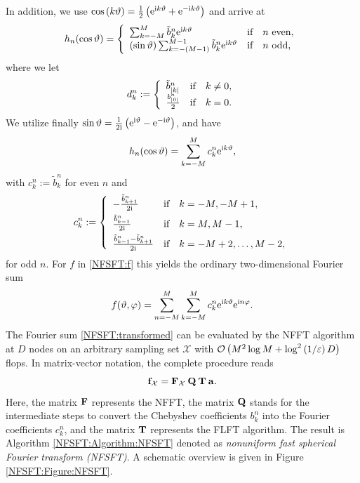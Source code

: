 In addition, we use $\cos{\hspace{-0.4ex}}\left(k \vartheta\right) = \frac{1}{2} \left(\mbox{\rm{e}}^{\mbox{\scriptsize\rm{i}} k \vartheta} + \mbox{\rm{e}}^{-\mbox{\scriptsize\rm{i}} k \vartheta}\right)$ 
and arrive at
\[
  \fun{h_{n}}{\cos\vtheta} = 
    \left\{\begin{array}{l@{\quad \text{if} \quad}l}
      \sum_{k=-M}^{M} \tilde{b}_{k}^n \e^{\im k \vtheta} & n \text{ even},\\
      \paren{\sin \vtheta} \sum_{k=-(M-1)}^{M-1} \tilde{b}_{k}^n \e^{\im k \vtheta} & n \text{ odd},
    \end{array}\right. 
\]
where we let
\begin{align}
  d_{k}^n :=
    \left\{\begin{array}{l@{\quad \text{if} \quad}l}
      \tilde{b}_{|k|}^n & k \neq 0,\\
      \frac{b_{|0|}^n}{2} & k = 0.
    \end{array}\right. 
\end{align}
We utilize finally $\sin \vartheta = \frac{1}{2\mbox{\scriptsize\rm{i}}} \left(\mbox{\rm{e}}^{\mbox{\scriptsize\rm{i}} \vartheta} - \mbox{\rm{e}}^{-\mbox{\scriptsize\rm{i}} \vartheta}\right)$, and have
\[
  h_{n}{\hspace{-0.4ex}}\left(\cos\vartheta\right) = \sum_{k=-M}^{M} c_{k}^n \mbox{\rm{e}}^{\mbox{\scriptsize\rm{i}} k \vartheta},
\]
with $c_{k}^n := \tilde{b}_{k}^n$ for even $n$ and
\[
  c_{k}^n :=  
  \left\{\begin{array}{l@{\quad \text{if} \quad}l}
    - \frac{\tilde{b}_{k+1}^n}{2\im} & k = -M,-M+1,\\[1ex]
      \frac{\tilde{b}_{k-1}^n}{2\im} & k = M,M-1,\\[1ex]
      \frac{\tilde{b}_{k-1}^n - \tilde{b}_{k+1}^n}{2\im} & k = -M+2,\dots,M-2,
  \end{array} \right.
\]
for odd $n$. For $f$ in \eqref{NFSFT:f} this yields the ordinary two-dimensional Fourier sum
\begin{equation}
  \label{NFSFT:transformed}
  f{\hspace{-0.4ex}}\left(\vartheta,\varphi\right) = \sum_{n=-M}^{M} \sum_{k=-M}^M c_{k}^n \mbox{\rm{e}}^{\mbox{\scriptsize\rm{i}} k \vartheta} \mbox{\rm{e}}^{\mbox{\scriptsize\rm{i}} n \varphi}.
\end{equation}
The Fourier sum \eqref{NFSFT:transformed} can be evaluated by the NFFT algorithm at $D$ nodes on an arbitrary sampling set $\mathcal{X}$ with
$\mathcal{O}\left(M^2 \log M + \log^2{\hspace{-0.4ex}}\left(1/\varepsilon\right)D\right)$ flops.
In matrix-vector notation, the complete procedure reads
\begin{equation}
  \label{NFSFT:fastFactorization}
  \mathbf{f}_{\mathcal{X}} = \mathbf{F}_{\mathcal{X}} \: \mathbf{Q} \: \mathbf{T} \: \mathbf{a}.
\end{equation}
Here, the matrix $\mathbf{F}$ represents the NFFT, the matrix $\mathbf{Q}$ stands for the intermediate steps to convert the Chebyshev coefficients $b_{k}^n$ 
into the Fourier coefficients $c_{k}^n$, and the matrix $\mathbf{T}$ represents the FLFT algorithm. The result is Algorithm \ref{NFSFT:Algorithm:NFSFT} denoted as 
\emph{nonuniform fast spherical Fourier transform (NFSFT)}. A schematic overview is given in Figure \ref{NFSFT:Figure:NFSFT}.

